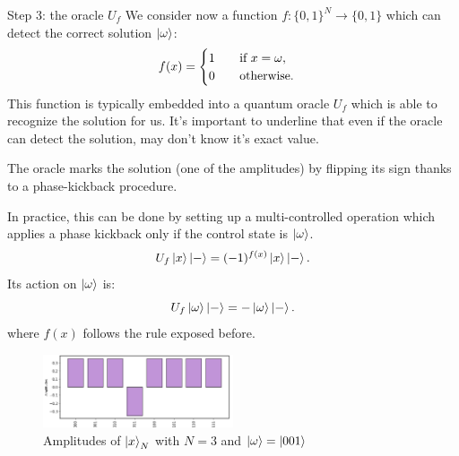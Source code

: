 \documentclass[aspectratio=169, 8pt, xcolor={svgnames}, hyperref={linkcolor=black}]{beamer}
\begin{document}
\begin{frame}{Step 3: the oracle $U_f$}
We consider now a function $f:\{0,1\}^N \to \{0,1\}$ which can detect the correct solution $\ket{\omega}$:
$$ 
f(x) = \begin{cases}
1 \qquad \text{if\,\,} x=\omega, \\
0 \qquad \text{otherwise}.
\end{cases} $$ \pause
This function is typically embedded into a quantum oracle $U_f$ which is able to 
recognize the solution for us. It's important to underline that even if the oracle 
can detect the solution, may don't know it's exact value. \pause

\textcolor{carnelian}{The oracle marks the solution (one of the amplitudes) by flipping its sign thanks to
a phase-kickback procedure.} \pause


\begin{multicols}{2}
In practice, this can be done by setting up a multi-controlled operation 
which applies a phase kickback only if the control state is $\ket{\omega}$.
$$ U_f \ket{x}\ket{-} = (-1)^{f(x)}\ket{x}\ket{-}. $$
Its action on $\ket{\omega}$ is:
$$ U_f \ket{\omega}\ket{-} = -\ket{\omega}\ket{-}. $$
where $f(x)$ follows the rule exposed before.
\begin{figure}
   \includegraphics[width=0.5\textwidth]{figures/state2.png}
   \caption*{Amplitudes of $\ket{x}_N$ with $N=3$ and $\ket{\omega} = \ket{001}$}
\end{figure}
\end{multicols}

\end{frame}
\end{document}
